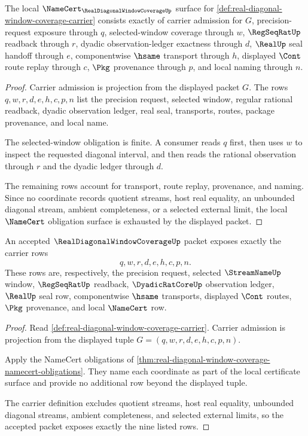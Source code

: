 \begin{theorem}
\label{thm:real-diagonal-window-coverage-namecert-obligations}
The local $\NameCert_{\RealDiagonalWindowCoverageUp}$ surface for \autoref{def:real-diagonal-window-coverage-carrier} consists exactly of carrier admission for $G$, precision-request exposure through $q$, selected-window coverage through $w$, $\RegSeqRatUp$ readback through $r$, dyadic observation-ledger exactness through $d$, $\RealUp$ seal handoff through $e$, componentwise $\hsame$ transport through $h$, displayed $\Cont$ route replay through $c$, $\Pkg$ provenance through $p$, and local naming through $n$.
\end{theorem}
\begin{proof}
Carrier admission is projection from the displayed packet $G$. The rows $q,w,r,d,e,h,c,p,n$ list the precision request, selected window, regular rational readback, dyadic observation ledger, real seal, transports, routes, package provenance, and local name.

The selected-window obligation is finite. A consumer reads $q$ first, then uses $w$ to inspect the requested diagonal interval, and then reads the rational observation through $r$ and the dyadic ledger through $d$.

The remaining rows account for transport, route replay, provenance, and naming. Since no coordinate records quotient streams, host real equality, an unbounded diagonal stream, ambient completeness, or a selected external limit, the local $\NameCert$ obligation surface is exhausted by the displayed packet.
\end{proof}

\begin{theorem}
\label{thm:real-diagonal-window-coverage-carrier-admission}
An accepted $\RealDiagonalWindowCoverageUp$ packet exposes exactly the carrier rows
$$
q,w,r,d,e,h,c,p,n.
$$
These rows are, respectively, the precision request, selected $\StreamNameUp$ window, $\RegSeqRatUp$ readback, $\DyadicRatCoreUp$ observation ledger, $\RealUp$ seal row, componentwise $\hsame$ transports, displayed $\Cont$ routes, $\Pkg$ provenance, and local $\NameCert$ row.
\end{theorem}
\begin{proof}
Read \autoref{def:real-diagonal-window-coverage-carrier}. Carrier admission is projection from the displayed tuple $G=(q,w,r,d,e,h,c,p,n)$.

Apply the NameCert obligations of \autoref{thm:real-diagonal-window-coverage-namecert-obligations}. They name each coordinate as part of the local certificate surface and provide no additional row beyond the displayed tuple.

The carrier definition excludes quotient streams, host real equality, unbounded diagonal streams, ambient completeness, and selected external limits, so the accepted packet exposes exactly the nine listed rows.
\end{proof}

